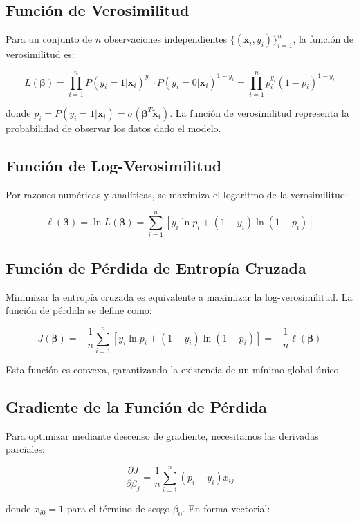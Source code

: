 \documentclass[12pt]{article}
\begin{document}
\subsection{Función de Verosimilitud}

Para un conjunto de $n$ observaciones independientes $\{(\mathbf{x}_i, y_i)\}_{i=1}^n$, la función de verosimilitud es:

\[
L(\boldsymbol{\beta}) = \prod_{i=1}^n P(y_i=1|\mathbf{x}_i)^{y_i} \cdot P(y_i=0|\mathbf{x}_i)^{1-y_i} = \prod_{i=1}^n p_i^{y_i} (1-p_i)^{1-y_i}
\]

donde $p_i = P(y_i=1|\mathbf{x}_i) = \sigma(\boldsymbol{\beta}^T \tilde{\mathbf{x}}_i)$. La función de verosimilitud representa la probabilidad de observar los datos dado el modelo.

\subsection{Función de Log-Verosimilitud}

Por razones numéricas y analíticas, se maximiza el logaritmo de la verosimilitud:

\[
\ell(\boldsymbol{\beta}) = \ln L(\boldsymbol{\beta}) = \sum_{i=1}^n \left[ y_i \ln p_i + (1-y_i) \ln(1-p_i) \right]
\]

\subsection{Función de Pérdida de Entropía Cruzada}

Minimizar la entropía cruzada es equivalente a maximizar la log-verosimilitud. La función de pérdida se define como:

\[
J(\boldsymbol{\beta}) = -\frac{1}{n} \sum_{i=1}^n \left[ y_i \ln p_i + (1-y_i) \ln(1-p_i) \right] = -\frac{1}{n} \ell(\boldsymbol{\beta})
\]

Esta función es convexa, garantizando la existencia de un mínimo global único.

\subsection{Gradiente de la Función de Pérdida}

Para optimizar mediante descenso de gradiente, necesitamos las derivadas parciales:

\[
\frac{\partial J}{\partial \beta_j} = \frac{1}{n} \sum_{i=1}^n (p_i - y_i) x_{ij}
\]

donde $x_{i0} = 1$ para el término de sesgo $\beta_0$. En forma vectorial:
\end{document}

